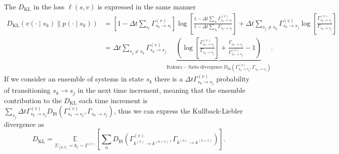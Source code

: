 The $D_{\mathrm{KL}}$ in the loss $\ell (s, v)$ is expressed in the same manner
\begin{equation}
	\begin{aligned}
		D_{\mathrm{KL}}(v(\cdot \mid s_k) \| p(\cdot \mid s_k))
		&=\left[1-\Delta t \sum_{s_l} \Gamma_{s_k \rightarrow s_l}^{(v)}\right] \log \left[\frac{1-\Delta t \sum_{s_l} \Gamma_{s_k \rightarrow s_l}^{(v)}}{1-\Delta t \sum_{s_l} \Gamma_{s_k \rightarrow s_l}}\right]+\Delta t \sum_{s_j \neq s_k} \Gamma_{s_k \rightarrow s_j}^{(v)} \log \left[\frac{\Gamma_{s_k \rightarrow s_j}^{(v)}}{\Gamma_{s_k \rightarrow s_j}}\right]\\
		&= \Delta t \sum_{s_j \neq s_k} \Gamma_{s_k \rightarrow s_j}^{(v)}\underbrace{\left(\log \left[\frac{\Gamma_{s_k \rightarrow s_j}^{(v)}}{\Gamma_{s_k \rightarrow s_j}}\right]+\frac{\Gamma_{s_k \rightarrow s_j}}{\Gamma_{s_k \rightarrow s_j}^{(v)}}-1\right)}_{\mathrm{Itakura-Saito~divergence~} D_{\mathrm{IS}}(\Gamma_{s_k \rightarrow s_j}^{(v)}, \Gamma_{s_k \rightarrow s_j})}.
	\end{aligned}
\end{equation}
If we consider an ensemble of systems in state $s_k$ there is a $\Delta t \Gamma_{s_k \rightarrow s_j}^{(v)}$ probability of transitioning $s_k \rightarrow s_j$ in the next time increment, meaning that the ensemble contribution to the $D_{\mathrm{KL}}$ each time increment is $\sum_{s_j} \Delta t \Gamma_{s_k \rightarrow s_j}^{(v)} D_{\mathrm{IS}}\left(\Gamma_{s_k \rightarrow s_j}^{(v)}, \Gamma_{s_k \rightarrow s_j}\right)$, thus we can express the Kullback-Liebler divergence as
\begin{equation}
	D_{\mathrm{KL}}=\underset{\Sigma_{[0, t]}=k_{t} \sim \Gamma^{(v)}}{\mathbb{E}}\left[\sum_{n} D_{\mathrm{IS}}\left(\Gamma_{k^{(n)} \rightarrow k^{(n+1)}}^{(v)}, \Gamma_{k^{(n)} \rightarrow k^{(n+1)}}\right)\right].
\end{equation}
